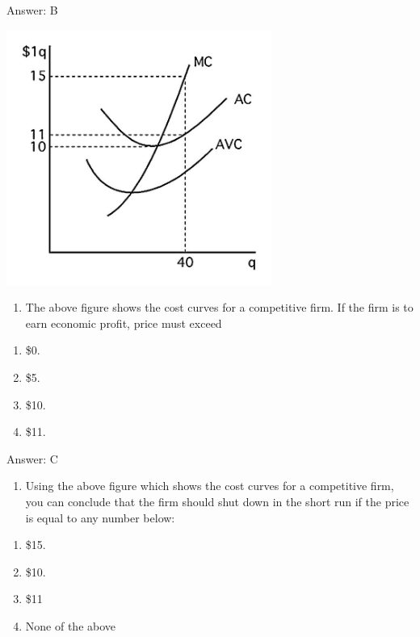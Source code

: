 \documentclass[11pt,]{article}
\providecommand{\tightlist}{%
  \setlength{\itemsep}{0pt}\setlength{\parskip}{0pt}}
\begin{document}
Answer: B

\begin{center}
\includegraphics[width=0.65\textwidth]{week_11.jpg}
\end{center}

\begin{enumerate}
\def\labelenumi{\arabic{enumi})}
\setcounter{enumi}{5}
\tightlist
\item
  The above figure shows the cost curves for a competitive firm. If the
  firm is to earn economic profit, price must exceed
\end{enumerate}

\begin{enumerate}
\def\labelenumi{\Alph{enumi})}
\tightlist
\item
  \$0.
\item
  \$5.
\item
  \$10.
\item
  \$11.
\end{enumerate}

Answer: C

\begin{enumerate}
\def\labelenumi{\arabic{enumi})}
\setcounter{enumi}{6}
\tightlist
\item
  Using the above figure which shows the cost curves for a competitive
  firm, you can conclude that the firm should shut down in the short run
  if the price is equal to any number below:
\end{enumerate}

\begin{enumerate}
\def\labelenumi{\Alph{enumi})}
\tightlist
\item
  \$15.
\item
  \$10.
\item
  \$11
\item
  None of the above
\end{enumerate}
\end{document}
